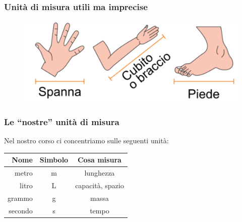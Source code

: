 \documentclass[handout]{beamer}
\theoremstyle{plain}
\begin{document}
\begin{frame}
\frametitle{Unità di misura utili ma imprecise}
\begin{figure}
  \includegraphics[width=\columnwidth]{img/spanna.png}
\end{figure}
\end{frame}






\begin{frame}
\frametitle{Le ``nostre'' unità di misura}
Nel nostro corso ci concentriamo sulle seguenti unità:

\begin{table}[]\def\arraystretch{1.5}
  \begin{tabular}{rcc}
  \textbf{Nome} & \textbf{Simbolo} & \textbf{Cosa misura} \\\hline
  metro         & m                & lunghezza            \\\hline
  litro         & L                & capacità, spazio     \\\hline
  grammo        & g                & massa                \\\hline
  secondo       & s                & tempo                \\\hline
  \end{tabular}
\end{table}
\end{frame}
\end{document}
